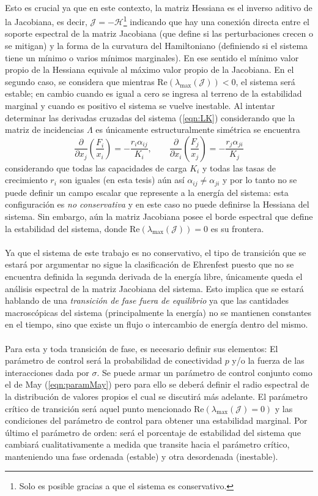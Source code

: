 \\
Esto es crucial ya que en este contexto, la matriz Hessiana es el inverso aditivo de la Jacobiana, es decir, $\mathcal{J}=-\mathcal{H}$\footnote{Solo es posible gracias a que el sistema es conservativo.} indicando que hay una conexión directa entre el soporte espectral de la matriz Jacobiana (que define si las perturbaciones crecen o se mitigan) y la forma de la curvatura del Hamiltoniano (definiendo si el sistema tiene un mínimo o varios mínimos marginales). En ese sentido el mínimo valor propio de la Hessiana equivale al máximo valor propio de la Jacobiana. En el segundo caso, se considera que mientras Re$(\lambda_{\max}(\mathcal{J}))<0$, el sistema será estable; en cambio cuando es igual a cero se ingresa al terreno de la estabilidad marginal y cuando es positivo el sistema se vuelve inestable.
\newpage
Al intentar determinar las derivadas cruzadas del sistema (\ref{eqn:LK}) considerando que la matriz de incidencias $\Lambda$ es únicamente estructuralmente simétrica se encuentra
$$\frac{\partial}{\partial x_j}\left (\frac{F_i}{x_i}\right )=-\frac{r_i\alpha_{ij}}{K_i},\qquad\frac{\partial}{\partial x_i}\left (\frac{F_j}{x_j}\right )=-\frac{r_j\alpha_{ji}}{K_j}$$
considerando que todas las capacidades de carga $K_i$ y todas las tasas de crecimiento $r_i$ son iguales (en esta tesis) aún así $\alpha_{ij}\neq\alpha_{ji}$ y por lo tanto no se puede definir un campo escalar que represente a la energía del sistema: esta configuración es \textit{no conservativa} y en este caso no puede definirse la Hessiana del sistema. Sin embargo, aún la matriz Jacobiana posee el borde espectral que define la estabilidad del sistema, donde Re$(\lambda_{\max}(\mathcal{J}))=0$ es su frontera.
\\
\\
Ya que el sistema de este trabajo es no conservativo, el tipo de transición que se estará por argumentar no sigue la clasificación de Ehrenfest puesto que no se encuentra definida la segunda derivada de la energía libre, únicamente queda el análisis espectral de la matriz Jacobiana del sistema. Esto implica que se estará hablando de una \textit{transición de fase fuera de equilibrio} ya que las cantidades macroscópicas del sistema (principalmente la energía) no se mantienen constantes en el tiempo, sino que existe un flujo o intercambio de energía dentro del mismo. \\
\\
Para esta y toda transición de fase, es necesario definir sus elementos: El parámetro de control será la probabilidad de conectividad $p$ y/o la fuerza de las interacciones dada por $\sigma$. Se puede armar un parámetro de control conjunto como el de May (\ref{eqn:paramMay}) pero para ello se deberá definir el radio espectral de la distribución de valores propios el cual se discutirá más adelante. El parámetro crítico de transición será aquel punto mencionado Re$(\lambda_{\max}(\mathcal{J})=0)$ y las condiciones del parámetro de control para obtener una estabilidad marginal. Por último el parámetro de orden: será el porcentaje de estabilidad del sistema que cambiará cualitativamente a medida que transite hacia el parámetro crítico, manteniendo una fase ordenada (estable) y otra desordenada (inestable).\\

